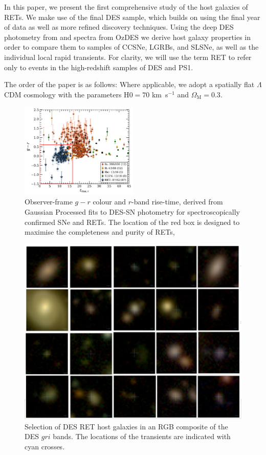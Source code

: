 \documentclass[fleqn,usenatbib,]{mnras}
\begin{document}
In this paper, we present the first comprehensive study of the host galaxies of RETs. We make use of the final DES sample, which builds on \citet{Pursiainen2018} using the final year of data as well as more refined discovery techniques. Using the deep DES photometry from \citet{Wiseman2020} and spectra from OzDES \citep{Lidman2020} we derive host galaxy properties in order to compare them to samples of CCSNe, LGRBs, and SLSNe, as well as the individual local rapid transients. For clarity, we will use the term RET to refer only to events in the high-redshift samples of DES and PS1. 

The order of the paper is as follows:
Where applicable, we adopt a spatially flat $\Lambda$CDM cosmology with the parameters H$0=70$ km~s$^{-1}$ and $\Omega_{\textrm{M}}=0.3$.

\begin{figure}
\includegraphics[width=0.5\textwidth]{figs/gr_trise_r.pdf}
\caption{Observer-frame $g-r$ colour and $r$-band rise-time, derived from Gaussian Processed fits to DES-SN photometry for spectroscopically confirmed SNe and  RETs. The location of the red box is designed to maximise the completeness and purity of RETs, 
\label{fig:selection}}
\end{figure}

\begin{figure}
\includegraphics[width=\textwidth]{figs/RET_Mosaic.png}
\caption{Selection of DES RET host galaxies in an RGB composite of the DES $gri$ bands. The locations of the transients are indicated with cyan crosses.
\label{fig:mag_dist}}
\end{figure}
\end{document}
